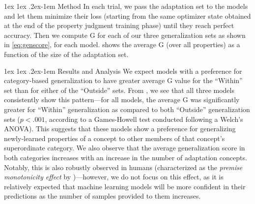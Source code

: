 \documentclass[10pt,letterpaper]{article}
\makeatletter
\newcommand{\metric}{\mathrm{G}}
\renewcommand{\paragraph}{%
  \@startsection{paragraph}{4}%
  {\z@}{1ex \@plus 1ex \@minus .2ex}{-1em}%
  {\normalfont\normalsize\bfseries}%
}
\makeatother
\begin{document}
\paragraph{Method}
In each trial, we pass the adaptation set to the models and let them minimize their loss (starting from the same optimizer state obtained at the end of the property judgment training phase) until they reach perfect accuracy. Then we compute $\metric$ for each of our three generalization sets as shown in \cref{eq:genscore}, for each model. 
 shows the average $\metric$ (over all properties) as a function of the size of the adaptation set.

\paragraph{Results and Analysis}
We expect models with a preference for category-based generalization to have greater average $\metric$ value for the ``Within'' set than for either of the ``Outside'' sets.
From , we see that all three models consistently show this pattern---for all models, the average $\metric$ was significantly greater for ``Within'' generalization as compared to both ``Outside'' generalization sets ($p <.001$, according to a Games-Howell test conducted following a Welch's ANOVA). 
This suggests that these models show a preference for  generalizing newly-learned properties of a concept to other members of that concept's superordinate category.
We also observe that the average generalization score in both categories increases with an increase in the number of adaptation concepts. Notably, this is also robustly observed in humans (characterized as the \textit{premise monotonicity effect} by \citeauthor{osherson1990category})---however, we do not focus on this effect, as it is relatively expected that machine learning models will be more confident in their predictions as the number of samples provided to them increases.
\end{document}
